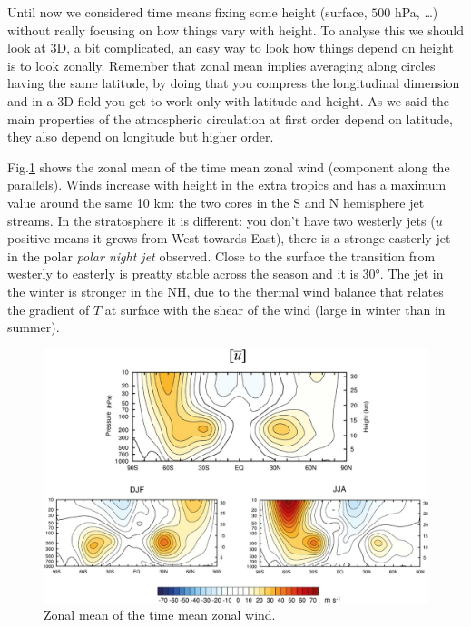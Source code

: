 Until now we considered time means fixing some height (surface, $500$ hPa, \dots) without really focusing on how things vary with height. To analyse this we should look at 3D, a bit complicated, an easy way to look how things depend on height is to look zonally. Remember that zonal mean implies averaging along circles having the same latitude, by doing that you compress the longitudinal dimension and in a 3D field you get to work only with latitude and height. As we said the main properties of the atmospheric circulation at first order depend on latitude, they also depend on longitude but higher order. 

Fig.\ref{fig:zonal mean} shows the zonal mean of the time mean zonal wind (component along the parallels). Winds increase with height in the extra tropics and has a maximum value around the same 10 km: the two cores in the S and N hemisphere jet streams. 
In the stratosphere it is different: you don't have two westerly jets ($u$ positive means it grows from West towards East), there is a stronge easterly jet in the polar \textit{polar night jet} observed. Close to the surface the transition from westerly to easterly is preatty stable across the season and it is 30°. The jet in the winter is stronger in the NH, due to the thermal wind balance that relates the gradient of $T$ at surface with the shear of the wind (large in winter than in summer).

\begin{figure}[htpb]
    \centering
    \includegraphics[width=0.5\linewidth]{uploads/Zonal mean.png}
    \caption{Zonal mean of the time mean zonal wind.}
    \label{fig:zonal mean}
\end{figure}



